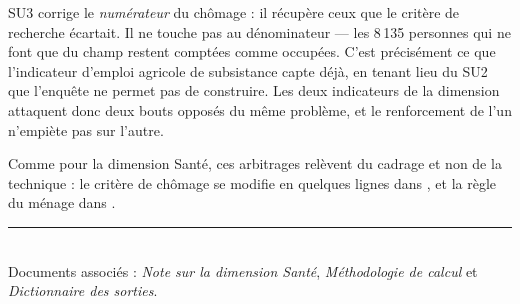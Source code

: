 \documentclass[11pt,a4paper]{article}
\begin{document}
\begin{retenir}
SU3 corrige le \emph{numérateur} du chômage : il récupère ceux que le critère de recherche
écartait. Il ne touche pas au dénominateur --- les 8\,135 personnes qui ne font que du champ
restent comptées comme occupées. C'est précisément ce que l'indicateur d'emploi agricole de
subsistance capte déjà, en tenant lieu du SU2 que l'enquête ne permet pas de construire. Les deux
indicateurs de la dimension attaquent donc deux bouts opposés du même problème, et le
renforcement de l'un n'empiète pas sur l'autre.
\end{retenir}

Comme pour la dimension Santé, ces arbitrages relèvent du cadrage et non de la technique : le
critère de chômage se modifie en quelques lignes dans
, et la règle du ménage dans
.

\vfill
\noindent\rule{\linewidth}{0.4pt}\\[2pt]
\small
Documents associés : \emph{Note sur la dimension Santé}, \emph{Méthodologie de calcul} et
\emph{Dictionnaire des sorties}.
\end{document}
